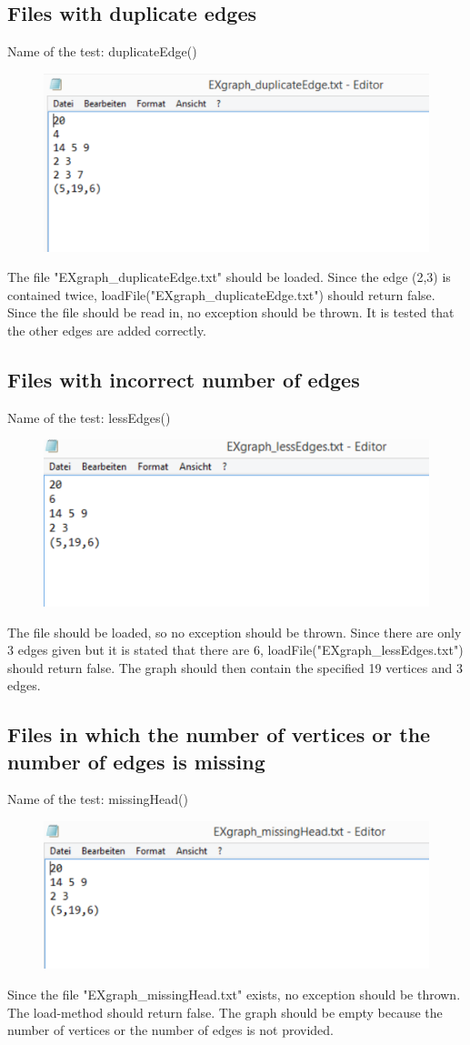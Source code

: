 \documentclass{article}
\begin{document}
\subsection{Files with duplicate edges}
Name of the test: duplicateEdge()
\begin{figure}[H]
	\includegraphics[width=.7\textwidth,keepaspectratio]{./img/duplicateEdge.pdf}
\end{figure}
The file "EXgraph\_duplicateEdge.txt" should be loaded. Since the edge (2,3) is contained twice, loadFile("EXgraph\_duplicateEdge.txt") should return false. Since the file should be read in, no exception should be thrown. It is tested that the other edges are added correctly.
\subsection{Files with incorrect number of edges}
Name of the test: lessEdges()
\begin{figure}[H]
	\includegraphics[width=.7\textwidth,keepaspectratio]{./img/lessEdges.pdf}
\end{figure}
The file should be loaded, so no exception should be thrown. Since there are only 3 edges given but it is stated that there are 6, loadFile("EXgraph\_lessEdges.txt") should return false. The graph should then contain the specified 19 vertices and 3 edges.
\subsection{Files in which the number of vertices or the number of edges is missing}
Name of the test: missingHead()
\begin{figure}[H]
	\includegraphics[width=.7\textwidth,keepaspectratio]{./img/missingHead.pdf}
\end{figure}
Since the file "EXgraph\_missingHead.txt" exists, no exception should be thrown. The load-method should return false. The graph should be empty because the number of vertices or the number of edges is not provided.
\end{document}
